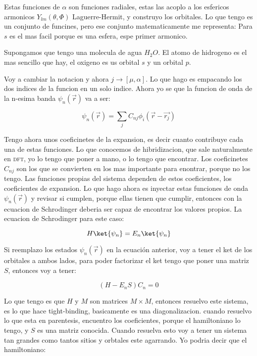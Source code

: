 \documentclass[11pt,fleqn]{book}
\begin{document}
Estas funciones de $\alpha$ son funciones radiales, estas las acoplo a los esfericos armonicos $Y_{lm}(\theta,\Phi)$ Laguerre-Hermit, y construyo los orbitales. Lo que tengo es un conjunto de funcines, pero ese conjunto matematicamente me representa: Para $s$ es el mas facil porque es una esfera, espe primer armonico. 

\begin{example}
Supongamos que tengo una molecula de agua $H_{2}O$. El atomo de hidrogeno es el mas sencillo que hay, el oxigeno es us orbital $s$ y un orbital $p$. 
\end{example}

Voy a cambiar la notacion y ahora $j\rightarrow[\mu,\alpha]$. Lo que hago es empacando los dos indices de la funcion en un solo indice. Ahora yo se que la funcion de onda de la n-esima banda $\psi_{n}(\vec{r})$ va a ser:

\begin{equation}
    \psi_{n}(\vec{r})=\sum_{j}C_{nj}\phi_{i}(\vec{r}-\vec{r_{j}})
\end{equation}

Tengo ahora unos coeficinetes de la expansion, es decir cuanto contribuye cada una de estas funciones. Lo que conocemos de hibridizacion, que sale naturalmente en \textsc{dft}, yo lo tengo que poner a mano, o lo tengo que encontrar. Los coeficinetes $C_{nj}$ son los que se convierten en los mas importante para enontrar, porque no los tengo. Las funciones propias del sistema dependen de estos coeficientes, los coeficientes de expansion. Lo que hago ahora es inyectar estas funciones de onda $\psi_{n}(\vec{r})$ y revisar si cumplen, porque ellas tienen que cumplir, entonces con la ecuacion de Schrodinger deberia ser capaz de encontrar los valores propios. La ecuacion de Schrodinger para este caso:

\begin{equation}
    H\ket{\psi_{n}}=E_{n}\ket{\psi_{n}}
\end{equation}

Si reemplazo los estados $\psi_{n}(\vec{r})$ en la ecuación anterior, voy a tener el ket de los orbitales a ambos lados, para poder factorizar el ket tengo que poner una matriz $S$, entonces voy a tener:

\begin{equation}
    (H-E_{n}S)C_{n}=0
\end{equation}

Lo que tengo es que $H$ y $M$ son matrices $M\times M$, entonces resuelvo este sistema, es lo que hace tight-binding, basicamente es una diagonalizacion. cuando resuelvo lo que esta en parentesis, encuentro los coeficientes, porque el hamiltoniano lo tengo, y $S$ es una matriz conocida. Cuando resuelva esto voy a tener un sistema tan grandes como tantos sitios y orbtales este agarrando. Yo podria decir que el hamiltoniano:
\end{document}
